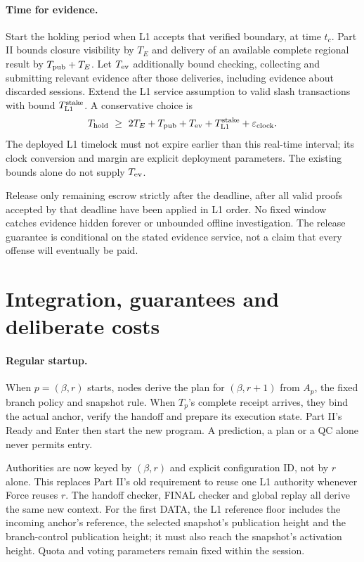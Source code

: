 \documentclass[11pt,a4paper]{article}
\begin{document}
\paragraph{Time for evidence.}
Start the holding period when L1 accepts that verified boundary, at time
$t_c$. Part II bounds closure visibility by $T_E$ and delivery of an
available complete regional result by $T_{\rm pub}+T_E$. Let $T_{\rm ev}$
additionally bound checking, collecting and submitting relevant evidence
after those deliveries, including evidence about discarded sessions.
Extend the L1 service assumption to valid slash transactions with bound
$T_{\rm L1}^{\rm stake}$. A conservative choice is
\[
 T_{\rm hold}\ \ge\ 2T_E+T_{\rm pub}+T_{\rm ev}
                 +T_{\rm L1}^{\rm stake}+\varepsilon_{\rm clock}.
\]
The deployed L1 timelock must not expire earlier than this real-time
interval; its clock conversion and margin are explicit deployment
parameters. The existing bounds alone do not supply $T_{\rm ev}$.

Release only remaining escrow strictly after the deadline, after all
valid proofs accepted by that deadline have been applied in L1 order.
No fixed window catches evidence hidden forever or unbounded offline
investigation. The release guarantee is conditional on the stated
evidence service, not a claim that every offense will eventually be paid.

\newpage
\section{Integration, guarantees and deliberate costs}
\label{sec:integration}
\paragraph{Regular startup.}
When $p=(\beta,r)$ starts, nodes derive the plan for $(\beta,r+1)$ from
$A_p$, the fixed branch policy and snapshot rule. When $T_p$'s complete
receipt arrives, they bind the actual anchor, verify the handoff and
prepare its execution state. Part II's Ready and Enter then start the
new program. A prediction, a plan or a QC alone never permits entry.

Authorities are now keyed by $(\beta,r)$ and explicit configuration ID,
not by $r$ alone. This replaces Part II's old requirement to reuse one L1
authority whenever Force reuses $r$. The handoff checker, FINAL checker
and global replay all derive the same new context. For the first DATA,
the L1 reference floor includes the incoming anchor's reference, the
selected snapshot's publication height and the branch-control publication
height; it must also reach the snapshot's activation height. Quota and
voting parameters remain fixed within the session.
\end{document}
